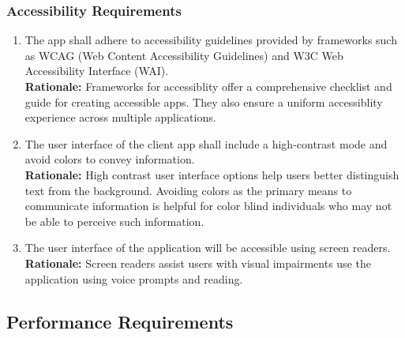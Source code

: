 \documentclass[]{article}
\begin{document}
\subsubsection{Accessibility Requirements}
\label{ssub:accessibility_requirements}
\begin{enumerate}[{UH-A}1. ]
	\item The app shall adhere to accessibility guidelines provided by frameworks such as WCAG (Web Content Accessibility Guidelines) and W3C Web Accessibility Interface (WAI). \cite{(WAI)}\\
	\textbf{Rationale:} Frameworks for accessiblity offer a comprehensive checklist and guide for creating accessible apps. They also ensure a uniform accessiblity experience across multiple applications.
	\item The user interface of the client app shall include a high-contrast mode and avoid colors to convey information.\\
	\textbf{Rationale:} High contrast user interface options help users better distinguish text from the background. Avoiding colors as the primary means to communicate information is helpful for color blind individuals
	who may not be able to perceive such information.
	\item The user interface of the application will be accessible using screen readers.\\
	\textbf{Rationale:} Screen readers assist users with visual impairments use the application using voice prompts and reading.
\end{enumerate}


\subsection{Performance Requirements}
\label{sub:performance_requirements}
\end{document}
